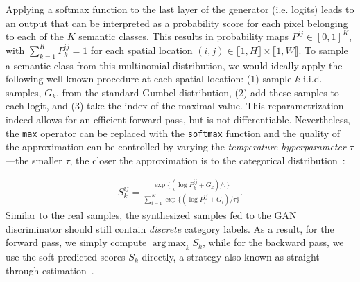 \documentclass[10pt,twocolumn,letterpaper]{article}
\DeclareMathOperator*{\argmax}{arg\,max}
\begin{document}
Applying a softmax function to the last layer of the generator (i.e. logits) leads to an output that can be interpreted as a probability score for each pixel belonging to each of the $K$ semantic classes. This results in probability maps $P^{ij} \in [0, 1]^{K}$, with $\sum_{k=1}^K P^{ij}_{k} =1$ for each spatial location $(i, j) \in \llbracket 1, H\rrbracket \times \llbracket 1, W \rrbracket$. To sample a semantic class from this multinomial distribution, we would ideally apply the following well-known procedure at each spatial location: (1) sample $k$ i.i.d. samples, $G_k$, from the standard Gumbel distribution, (2) add these samples to each logit, and (3) take the index of the maximal value. This reparametrization indeed allows for an efficient forward-pass, but is not differentiable. Nevertheless, the \texttt{max} operator can be replaced with the \texttt{softmax} function and the quality of the approximation can be controlled by varying the \emph{temperature hyperparameter} $\tau$---the smaller $\tau$, the closer the approximation is to the categorical distribution~\cite{jang2016categorical}:

\begin{eqnarray}
\label{gumbel}
S^{ij}_k = \frac{\exp\{(\log P^{ij}_k + G_k)/\tau\}}{\sum_{i=1}^K \exp\{(\log P^{ij}_i + G_i)/\tau\}}.
\end{eqnarray} Similar to the real samples, the synthesized samples fed to the GAN discriminator should still contain \emph{discrete} category labels. As a result, for the forward pass, we simply compute $\argmax_k S_k$, while for the backward pass, we use the soft predicted scores $S_k$ directly, a strategy also known as straight-through estimation~\cite{jang2016categorical}.
\end{document}
